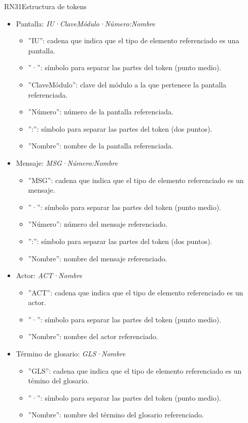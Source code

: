 \begin{BussinesRule}{RN31}{Estructura de tokens}
\begin{itemize}
		\item Pantalla: {\em IU·ClaveMódulo·Número:Nombre}
		\begin{itemize}
			\item ''IU'': cadena que indica que el tipo de elemento referenciado es una pantalla.
			\item ''·'': símbolo para separar las partes del token (punto medio).
			\item ''ClaveMódulo'': clave del módulo a la que pertenece la pantalla referenciada.
			\item ''Número'': número de la pantalla referenciada.
			\item '':'': símbolo para separar las partes del token (dos puntos).
			\item ''Nombre'': nombre de la pantalla referenciada.
		\end{itemize}
		\item Mensaje: {\em MSG·Número:Nombre}
		\begin{itemize}
			\item ''MSG'': cadena que indica que el tipo de elemento referenciado es un mensaje.
			\item ''·'':  símbolo para separar las partes del token (punto medio).
			\item ''Número'': número del mensaje referenciado.
			\item '':'': símbolo para separar las partes del token (dos puntos).
			\item ''Nombre'': nombre del mensaje referenciado.
		\end{itemize}
	\item Actor: {\em ACT·Nombre}
		\begin{itemize}
			\item ''ACT'': cadena que indica que el tipo de elemento referenciado es un actor.
			\item ''·'':  símbolo para separar las partes del token (punto medio).
			\item ''Nombre'': nombre del actor referenciado.
		\end{itemize}
	\item Término de glosario: {\em GLS·Nombre}
		\begin{itemize}
			\item ''GLS'': cadena que indica que el tipo de elemento referenciado es un témino del glosario.
			\item ''·'':  símbolo para separar las partes del token (punto medio).
			\item ''Nombre'': nombre del término del glosario referenciado.

\end{itemize}
\end{itemize}
\end{BussinesRule}
